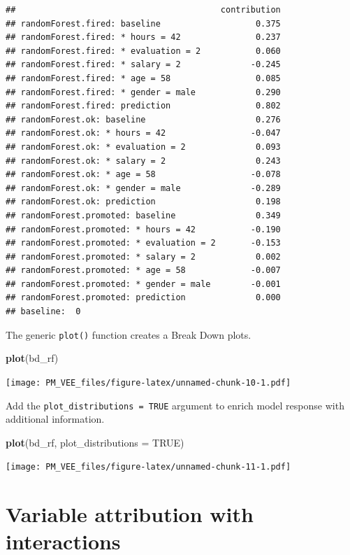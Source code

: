 \documentclass[]{krantz}
\newenvironment{Shaded}{\begin{snugshade}}{\end{snugshade}}
\newcommand{\DataTypeTok}[1]{\textcolor[rgb]{0.13,0.29,0.53}{#1}}
\newcommand{\KeywordTok}[1]{\textcolor[rgb]{0.13,0.29,0.53}{\textbf{#1}}}
\newcommand{\NormalTok}[1]{#1}
\newcommand{\OtherTok}[1]{\textcolor[rgb]{0.56,0.35,0.01}{#1}}
\theoremstyle{definition}
\theoremstyle{definition}
\theoremstyle{definition}
\theoremstyle{remark}
\begin{document}
\begin{verbatim}
##                                         contribution
## randomForest.fired: baseline                   0.375
## randomForest.fired: * hours = 42               0.237
## randomForest.fired: * evaluation = 2           0.060
## randomForest.fired: * salary = 2              -0.245
## randomForest.fired: * age = 58                 0.085
## randomForest.fired: * gender = male            0.290
## randomForest.fired: prediction                 0.802
## randomForest.ok: baseline                      0.276
## randomForest.ok: * hours = 42                 -0.047
## randomForest.ok: * evaluation = 2              0.093
## randomForest.ok: * salary = 2                  0.243
## randomForest.ok: * age = 58                   -0.078
## randomForest.ok: * gender = male              -0.289
## randomForest.ok: prediction                    0.198
## randomForest.promoted: baseline                0.349
## randomForest.promoted: * hours = 42           -0.190
## randomForest.promoted: * evaluation = 2       -0.153
## randomForest.promoted: * salary = 2            0.002
## randomForest.promoted: * age = 58             -0.007
## randomForest.promoted: * gender = male        -0.001
## randomForest.promoted: prediction              0.000
## baseline:  0
\end{verbatim}

The generic \texttt{plot()} function creates a Break Down plots.

\begin{Shaded}
\begin{Highlighting}[]
\KeywordTok{plot}\NormalTok{(bd_rf) }
\end{Highlighting}
\end{Shaded}

\texttt{[image: PM\_VEE\_files/figure-latex/unnamed-chunk-10-1.pdf]}

Add the \texttt{plot\_distributions\ =\ TRUE} argument to enrich model
response with additional information.

\begin{Shaded}
\begin{Highlighting}[]
\KeywordTok{plot}\NormalTok{(bd_rf, }\DataTypeTok{plot_distributions =} \OtherTok{TRUE}\NormalTok{) }
\end{Highlighting}
\end{Shaded}

\texttt{[image: PM\_VEE\_files/figure-latex/unnamed-chunk-11-1.pdf]}

\hypertarget{variable-attribution-with-interactions}{%
\section{Variable attribution with
interactions}\label{variable-attribution-with-interactions}}
\end{document}
